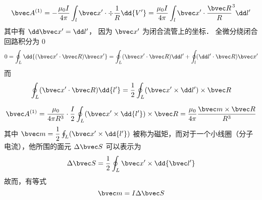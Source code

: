 \begin{equation}
\bvec A^{(1)}=-\dfrac{\mu_0 I }{4\pi}\int_l \bvec x^{\prime}\cdot\div\dfrac1 R\dd{V^{\prime}}=\dfrac{\mu_0 I }{4\pi}\int_l \bvec x^{\prime}\cdot\dfrac{\bvec R}R^3\dd l^{\prime}\label{edy33_eq7}
\end{equation}
其中有 $\dd \bvec x^{\prime}=\dd l^{\prime}$， 因为 $ \bvec x^{\prime}$ 为闭合流管上的坐标．
全微分绕闭合回路积分为 $0$
\begin{equation}
0=\oint_L \dd{(\bvec x^{\prime}\cdot \bvec R)\bvec x^{\prime}}=\oint_L (\bvec x^{\prime}\cdot\bvec R)\dd l^{\prime}+\oint_l (\dd l^{\prime}\cdot \bvec R)\bvec x^{\prime}\label{edy33_eq8}
\end{equation}
而
\begin{equation}
\oint_L (\bvec x^{\prime}\cdot \bvec R)\dd{l^{\prime}}=\dfrac1 2\oint_L (\bvec x^{\prime}\times \dd l^{\prime})\times \bvec R \label{edy33_eq9}
\end{equation}

\begin{equation}
\bvec A^{(1)}=\dfrac{\mu_0}{4\pi R^3}\cdot\dfrac{I}{2}\oint_L (\bvec x^{\prime}\times \dd{l^{\prime}})\times \bvec R=\dfrac{\mu_0}{4\pi}\dfrac{\bvec m \times \bvec R}{R^3}\label{edy33_eq10}
\end{equation}
其中 $\bvec m =\dfrac{1}{2}\oint_L (\bvec x^{\prime}\times \dd{l^{\prime}})$ 被称为磁矩，而对于一个小线圈（分子电流），他所围的面元 $\Delta\bvec S$ 可以表示为
\begin{equation}
\Delta\bvec S=\dfrac 1 2\oint_L \bvec x^{\prime}\times \dd{\bvec l^{\prime}}
\end{equation}
故而，有等式
\begin{equation}
\bvec m=I\Delta \bvec S
\end{equation}
